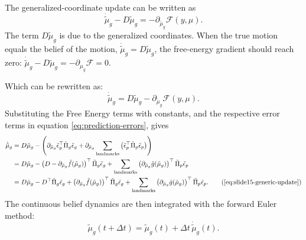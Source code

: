 The generalized-coordinate update can be written as
\begin{equation}
    \dot{\tilde{\mu}}_{g}
    -
    D\tilde{\mu}_{g}
    =
    -
    \partial_{\tilde\mu_g}\mathcal{F}(y,\mu).
    \label{eq:appendix-slide15-gradient-balance}
\end{equation}
The term $D\tilde{\mu}_{g}$ is due to the generalized coordinates. When the true motion equals the belief of the motion, $\dot{\tilde{\mu}}_{g}=D\tilde{\mu}_{g}$, the free-energy gradient should reach zero: $\dot{\tilde{\mu}}_{g}-D\tilde{\mu}_{g}=-\partial_{\mu_g}\mathcal{F}=0$.

Which can be rewritten as:
\begin{equation}
    \dot{\tilde{\mu}}_{g}
    =
    D\tilde{\mu}_{g}
    -
    \partial_{\tilde\mu_g}\mathcal{F}(y,\mu).
    \label{eq:appendix-slide15-start}
\end{equation}
 Substituting the Free Energy terms with constants, and the respective error terms in equation \ref{eq:prediction-errors}, gives
\begin{align}
    \dot{\tilde{\mu}}_{g}
    &=
    D\tilde{\mu}_{g}
    -
    \left(
        \partial_{\tilde\mu_g}\tilde{\epsilon}_{g}^{\top}
        \tilde{\Pi}_{g}\tilde{\epsilon}_{g}
        +
        \partial_{\tilde\mu_g}
        \sum_{\mathrm{landmarks}}
        \left(
            \tilde{\epsilon}_{p}^{\top}
            \tilde{\Pi}_{p}\tilde{\epsilon}_{p}
        \right)
    \right)
    \nonumber \\
    &=
    D\tilde{\mu}_{g}
    -
    \left(
        D
        -
        \partial_{\tilde\mu_g}\tilde{f}(\tilde{\mu}_{g})
    \right)^\top
    \tilde{\Pi}_{g}\tilde{\epsilon}_{g}
    +
    \sum_{\mathrm{landmarks}}
    \left(
        \partial_{\tilde\mu_g}\tilde{g}(\tilde{\mu}_{g})
    \right)^\top
    \tilde{\Pi}_{p}\tilde{\epsilon}_{p}
    \nonumber \\
    &=
    D\tilde{\mu}_{g}
    -
    D^\top\tilde{\Pi}_{g}\tilde{\epsilon}_{g}
    +
    \left(
        \partial_{\tilde\mu_g}\tilde{f}(\tilde{\mu}_{g})
    \right)^\top
    \tilde{\Pi}_{g}\tilde{\epsilon}_{g}
    +
    \sum_{\mathrm{landmarks}}
    \left(
        \partial_{\tilde\mu_g}\tilde{g}(\tilde{\mu}_{g})
    \right)^\top
    \tilde{\Pi}_{p}\tilde{\epsilon}_{p}.
    \tag{\ref{eq:slide15-generic-update}}
    \label{eq:appendix-slide15-derivation}
\end{align}
The continuous belief dynamics are then integrated with the forward Euler method:
\begin{equation}
    \tilde{\mu}_{g}(t+\Delta t)
    =
    \tilde{\mu}_{g}(t)
    +
    \Delta t\,
    \dot{\tilde{\mu}}_{g}(t).
    \label{eq:appendix-slide15-euler}
\end{equation}

